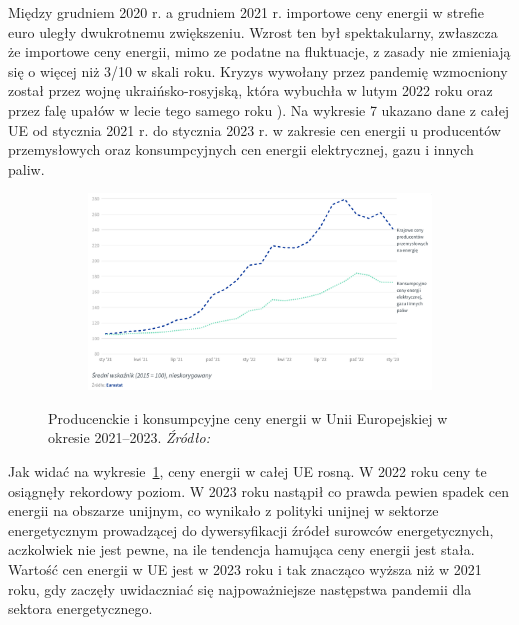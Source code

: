 \documentclass[polish, twoside, 12pt, a4paper]{article}
\theoremstyle{definition}
\theoremstyle{plain}
\theoremstyle{remark}
\begin{document}
Między grudniem 2020 r. a grudniem 2021 r. importowe ceny energii w strefie euro uległy dwukrotnemu zwiększeniu. Wzrost ten był spektakularny, zwłaszcza że importowe ceny energii, mimo ze podatne na fluktuacje, z zasady nie zmieniają się o więcej niż 3/10 w skali roku. Kryzys wywołany przez pandemię wzmocniony został przez wojnę ukraińsko-rosyjską, która wybuchła w lutym 2022 roku oraz przez falę upałów w lecie tego samego roku \parencite{council2023}). Na wykresie 7 ukazano dane z całej UE od stycznia 2021 r. do stycznia 2023 r. w zakresie cen energii u producentów przemysłowych oraz konsumpcyjnych cen energii elektrycznej, gazu i innych paliw.


\begin{figure}[hbt]
  \centering

  \begin{subfigure}[t]{0.45\textwidth}
    \hspace{-1.5cm}
    \includegraphics[width=1.4\textwidth]{./out_figures/figure_9}
  \end{subfigure}

  \captionsetup{margin=10pt,font=small,labelfont=bf,width=.8\textwidth}

  \caption[Producenckie i konsumpcyjne ceny energii w Unii Europejskiej w okresie 2021--2023]{Producenckie i konsumpcyjne ceny energii w Unii Europejskiej w okresie 2021--2023. \textit{Źródło:} \cite{council2023}}\label{fig:x9}
\end{figure}

Jak widać na wykresie~\ref{fig:x9}, ceny energii w całej UE rosną. W 2022 roku ceny te osiągnęły rekordowy poziom. W 2023 roku nastąpił co prawda pewien spadek cen energii na obszarze unijnym, co wynikało z polityki unijnej w sektorze energetycznym prowadzącej do dywersyfikacji źródeł surowców energetycznych, aczkolwiek nie jest pewne, na ile tendencja hamująca ceny energii jest stała. Wartość cen energii w UE jest w 2023 roku i tak znacząco wyższa niż w 2021 roku, gdy zaczęły uwidaczniać się najpoważniejsze następstwa pandemii dla sektora energetycznego. 
\end{document}
